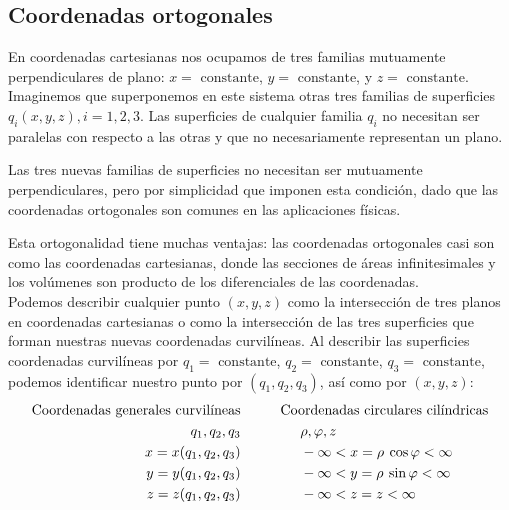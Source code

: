 \subsection{Coordenadas ortogonales}
En coordenadas cartesianas nos ocupamos de tres familias mutuamente perpendiculares de plano: $x = \mbox{ constante}$, $y = \mbox{ constante}$, y $z = \mbox{ constante}$. Imaginemos que superponemos en este sistema otras tres familias de superficies $q_{i} (x, y, z), i = 1,2,3$. Las superficies de cualquier familia $q_{i}$ no necesitan ser paralelas con respecto a las otras  y que no necesariamente representan un plano.
\par
Las tres nuevas familias de superficies no necesitan ser mutuamente perpendiculares, pero por simplicidad que imponen esta condición, dado que las coordenadas ortogonales son comunes en las aplicaciones físicas.
\par
Esta ortogonalidad tiene muchas ventajas: las coordenadas ortogonales casi son como las coordenadas cartesianas, donde las secciones de áreas infinitesimales y los volúmenes son producto de los diferenciales de las coordenadas.
\\
Podemos describir cualquier punto $(x, y, z)$ como la intersección de tres planos en coordenadas cartesianas o como la intersección de las tres superficies que forman nuestras nuevas coordenadas curvilíneas. Al describir las superficies coordenadas curvilíneas por $q_{1} = \mbox{ constante}$, $q_{2} = \mbox{ constante}$, $q_{3} = \mbox{ constante}$, podemos identificar nuestro punto por $(q_{1}, q_{2}, q_{3})$, así como por $(x, y, z)$:
\begin{eqnarray}
\begin{aligned}
\mbox{Coordenadas  generales curvilíneas} & \hspace{1.cm} \mbox{Coordenadas circulares cilíndricas} \\
q_{1}, q_{2}, q_{3} & \hspace{1.5cm} \rho, \varphi, z \\ 
x = x(q_{1},q_{2}, q_{3}) & \hspace{1.5cm} - \infty < x = \rho \: \cos \varphi < \infty \\ 
y = y(q_{1},q_{2}, q_{3}) & \hspace{1.5cm} - \infty < y = \rho \: \sin \varphi < \infty \\
z = z(q_{1},q_{2}, q_{3}) & \hspace{1.5cm} - \infty < z = z < \infty
\label{eq:ecuacion_02_01}
\end{aligned}
\end{eqnarray}
